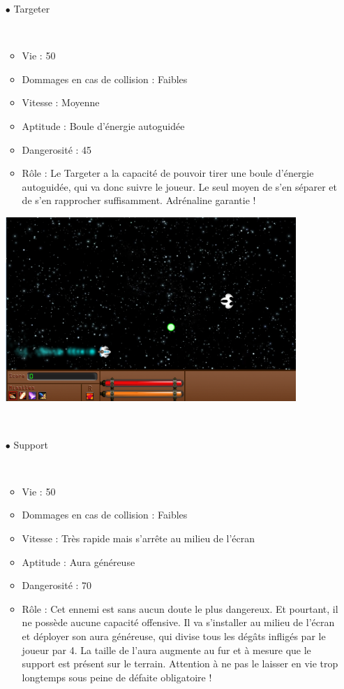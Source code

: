\begin{itemize}
				\par~
				\item[$\bullet$ Targeter]
				\par~
				\begin{itemize}
					\item Vie : 50
					\item Dommages en cas de collision : Faibles
					\item Vitesse : Moyenne
					\item Aptitude : Boule d'énergie autoguidée
					\item Dangerosité : 45%
					\item Rôle : Le Targeter a la capacité de pouvoir tirer une boule d'énergie autoguidée, qui va donc suivre le joueur. Le seul moyen de s'en séparer et de s'en rapprocher suffisamment. Adrénaline garantie !
				\end{itemize}
\includegraphics[width=11cm]{images/vaisseaux/targeter.png}
				\par~
				\item[$\bullet$ Support]
				\par~
				\begin{itemize}
					\item Vie : 50
					\item Dommages en cas de collision : Faibles
					\item Vitesse : Très rapide mais s'arrête au milieu de l'écran
					\item Aptitude : Aura généreuse
					\item Dangerosité : 70%
					\item Rôle : Cet ennemi est sans aucun doute le plus dangereux. Et pourtant, il ne possède aucune capacité offensive. Il va s'installer au milieu de l'écran et déployer son aura généreuse, qui divise tous les dégâts infligés par le joueur par 4. La taille de l'aura augmente au fur et à mesure que le support est présent sur le terrain. Attention à ne pas le laisser en vie trop longtemps sous peine de défaite obligatoire !

\end{itemize}
\end{itemize}
